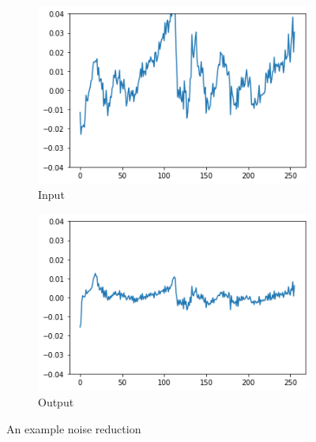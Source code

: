 \documentclass{article}
\begin{document}
	
		\begin{figure}[H]
		\centering
		\begin{subfigure}{.5\textwidth}
			\centering
			\includegraphics[width=.8\linewidth]{test_noisy}
			\caption{Input}
			\label{fig:test_noisy}
		\end{subfigure}%
		\begin{subfigure}{.5\textwidth}
			\centering
			\includegraphics[width=.8\linewidth]{test_clean}
			\caption{Output}
			\label{fig:test_clean}
		\end{subfigure}
		\caption{An example noise reduction}
		\label{fig:test}
	\end{figure}
	
	
\end{document}
